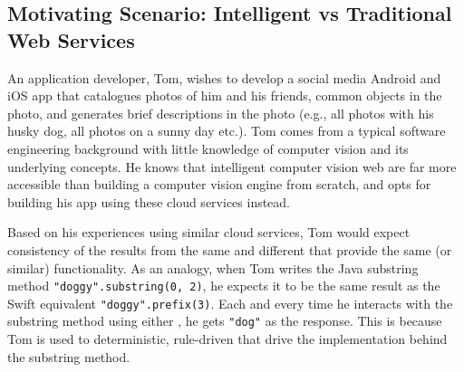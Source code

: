 \subsection{Motivating Scenario: Intelligent vs Traditional Web Services}

An application developer, Tom, wishes to develop a social media Android and iOS app that catalogues photos of him and his friends, common objects in the photo, and generates brief descriptions in the photo (e.g., all photos with his husky dog, all photos on a sunny day etc.). Tom comes from a typical software engineering background with little knowledge of computer vision and its underlying concepts. He knows that intelligent computer vision web  are far more accessible than building a computer vision engine from scratch, and opts for building his app using these cloud services instead.

Based on his experiences using similar cloud services, Tom would expect consistency of the results from the same  and different  that provide the same (or similar) functionality. As an analogy, when Tom writes the Java substring method \texttt{"doggy".substring(0, 2)}, he expects it to be the same result as the Swift equivalent \texttt{"doggy".prefix(3)}. Each and every time he interacts with the substring method using either , he gets \texttt{"dog"} as the response. This is because Tom is used to deterministic, rule-driven  that drive the implementation behind the substring method.

